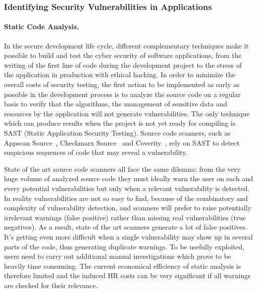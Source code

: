 \documentclass[a4paper,11pt]{article}
\begin{document}
\subsubsection{Identifying Security Vulnerabilities in Applications}
\label{sect:background-first}
\label{sect:identifying}

\paragraph{Static Code Analysis.}
In the secure development life cycle, different complementary techniques make it possible to build and test the cyber security of software applications, from the writing of the first line of code during the development project to the stress of the application in production with ethical hacking. In order to minimize the overall costs of security testing, the first action to be implemented as early as possible in the development process is to analyze the source code on a regular basis to verify that the algorithms, the management of sensitive data and resources by the application will not generate vulnerabilities. The only technique which can produce results when the project is not yet ready for compiling is SAST (Static Application Security Testing). Source code scanners, such as Appscan Source~\cite{AppScan}, Checkmarx Source~\cite{Checkmarx} and Coverity~\cite{Coverity}, rely on SAST to detect suspicious sequences of code that may reveal a vulnerability. 

State of the art source code scanners all face the same dilemna: from the very huge volume of analyzed source code they must ideally warn the user on each and every potential vulnerabilities but only when a relevant vulnerability is detected. In reality vulnerabilities are not so easy to find, because of the combinatory and complexity of vulnerability detection, and scanners will prefer to raise potentially irrelevant warnings (false positive) rather than missing real vulnerabilities (true negatives). As a result, state of the art scanners generate a lot of false positives. It's getting even more difficult when a single vulnerability may show up in several parts of the code, thus generating duplicate warnings. 
To be usefully exploited, users need to carry out additional manual investigations which prove to be heavily time consuming. The current economical efficiency of static analysis is therefore limited and the induced HR costs can be very significant if all warnings are checked for their relevance.
\end{document}
